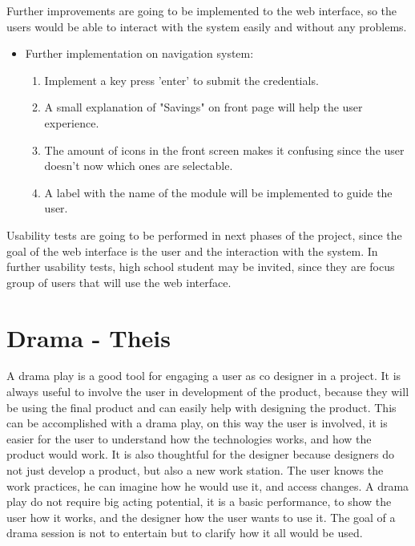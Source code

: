 Further improvements are going to be implemented to the web interface, so the users would be able to interact with the system easily and without any problems. \\
\begin{itemize}
	\item Further implementation on navigation system:
		\begin{enumerate}
			\item Implement a key press 'enter' to submit the credentials.
			\item A small explanation of "Savings" on front page will help the user experience.
			\item The amount of icons in the front screen makes it confusing since the user doesn't now which ones are selectable.
			\item  A label with the name of the module will be implemented to guide the user.
		\end{enumerate}
\end{itemize}

Usability tests are going to be performed in next phases of the project, since the goal of the web interface is the user and the interaction with the system. In further usability tests, high school student may be invited, since they are focus group of users that will use the web interface.\p

\section{Drama - Theis}
A drama play is a good tool for engaging a user as co designer in a project. It is always useful to involve the user in development of the product, because they will be using the final product and can easily help with designing the product. This can be accomplished with a drama play, on this way the user is involved, it is easier for the user to understand how the technologies works, and how the product would work. It is also thoughtful for the designer because designers do not just develop a product, but also a new work station. The user knows the work practices, he can imagine how he would use it, and access changes. A drama play do not require big acting potential, it is a basic performance, to show the user how it works, and the designer how the user wants to use it. The goal of a drama session is not to entertain but to clarify how it all would be used.

